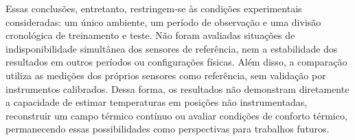 Essas conclusões, entretanto, restringem-se às condições
experimentais consideradas: um único ambiente, um período
de observação e uma divisão cronológica de treinamento e teste.
Não foram avaliadas situações de indisponibilidade simultânea
dos sensores de referência, nem a estabilidade dos resultados
em outros períodos ou configurações físicas. Além disso, a
comparação utiliza as medições dos próprios sensores como
referência, sem validação por instrumentos calibrados. Dessa
forma, os resultados não demonstram diretamente a capacidade
de estimar temperaturas em posições não instrumentadas,
reconstruir um campo térmico contínuo ou avaliar condições
de conforto térmico, permanecendo essas possibilidades
como perspectivas para trabalhos futuros.
